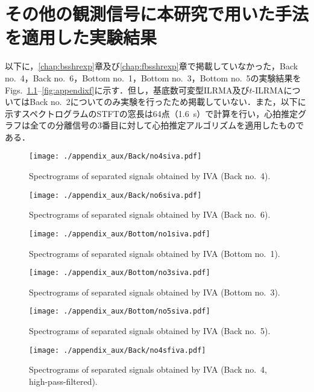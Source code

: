 \chapter{その他の観測信号に本研究で用いた手法を適用した実験結果}
\label{chap:ineq}

以下に，\ref{chap:bsshrexp}章及び\ref{chap:fbsshrexp}章で掲載していなかった，Back no.~4，Back no.~6，Bottom no.~1，Bottom no.~3，Bottom no.~5の実験結果をFigs.~\ref{fig:appendixs}--\ref{fig:appendixf}に示す．但し，基底数可変型ILRMA及び$t$-ILRMAについてはBack no.~2についてのみ実験を行ったため掲載していない．また，以下に示すスペクトログラムのSTFTの窓長は64点（1.6~s）で計算を行い，心拍推定グラフは全ての分離信号の3番目に対して心拍推定アルゴリズムを適用したものである．

\begin{figure}[tb]
\centering
\texttt{[image: ./appendix\_aux/Back/no4siva.pdf]}
\caption{Spectrograms of separated signals obtained by IVA (Back no.~4).}
\label{fig:appendixs}
\end{figure}

\begin{figure}[tb]
\centering
\texttt{[image: ./appendix\_aux/Back/no6siva.pdf]}
\caption{Spectrograms of separated signals obtained by IVA (Back no.~6).}
\end{figure}

\begin{figure}[tb]
\centering
\texttt{[image: ./appendix\_aux/Bottom/no1siva.pdf]}
\caption{Spectrograms of separated signals obtained by IVA (Bottom no.~1).}
\end{figure}

\begin{figure}[tb]
\centering
\texttt{[image: ./appendix\_aux/Bottom/no3siva.pdf]}
\caption{Spectrograms of separated signals obtained by IVA (Bottom no.~3).}
\end{figure}

\begin{figure}[tb]
\centering
\texttt{[image: ./appendix\_aux/Bottom/no5siva.pdf]}
\caption{Spectrograms of separated signals obtained by IVA (Back no.~5).}
\end{figure}

\begin{figure}[tb]
\centering
\texttt{[image: ./appendix\_aux/Back/no4sfiva.pdf]}
\caption{Spectrograms of separated signals obtained by IVA (Back no.~4, high-pass-filtered).}
\end{figure}

